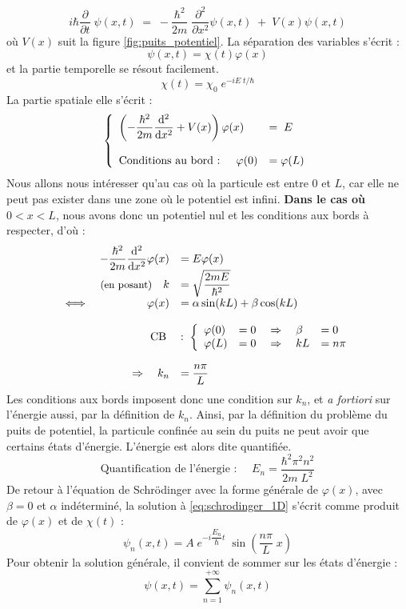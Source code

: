 \begin{equation}\label{eq:schrodinger_1D}
i \hbar \dfrac{\partial }{\partial t} \; \psi(x, t) \; = \; -\dfrac{\hbar ^2}{2m} \; \dfrac{ \partial ^2}{\partial x^2} \psi(x, t) \; + \; V(x) \psi(x,t)
\end{equation}
où $V(x)$ suit la figure \ref{fig:puits_potentiel}.
La séparation des variables s'écrit :
$$\psi(x,t) = \chi(t) \varphi(x)$$ et la partie temporelle se résout facilement.
$$\chi(t) = \chi_0 \; e^{-iE\; t/\hbar}$$
La partie spatiale elle s'écrit :
$$\left \{ \begin{array}{ll}
\left(-\dfrac{\hbar ^2}{2m} \dfrac{ \mathrm{d} ^2}{\mathrm{d} x^2 }  + V(x)\right) \varphi(x) \; &= \; E \\ \strut \\
\text{Conditions au bord : } \quad \varphi(0) &= \varphi(L)
\end{array} \right. $$
Nous allons nous intéresser qu'au cas où la particule est entre $0$ et $L$, car elle ne peut pas exister dans une zone où le potentiel est infini. \textbf{Dans le cas où} $0<x<L$, nous avons donc un potentiel nul et les conditions aux bords à respecter, d'où :
\begin{equation}
\begin{array}{lrl}
& -\dfrac{\hbar ^2}{2m} \dfrac{ \mathrm{d} ^2}{\mathrm{d} x^2 } \varphi(x) &= E \varphi (x) \\
&\text{\small (en posant)} \quad k &= \sqrt{\dfrac{2mE}{\hbar ^2}} \\
\iff & \varphi(x) &= \alpha \sin(kL) + \beta\cos(kL) \\ \strut \\
&\text{CB} \;  &:  \; \left\{ \begin{array}{lll}
\varphi(0) &= 0 \quad \Rightarrow \quad \beta &= 0 \\
\varphi(L) &= 0 \quad \Rightarrow \quad kL &= n\pi \\
\end{array}\right. \\ \strut \\
&\Rightarrow \quad k_n &= \dfrac{n\pi}{L}
\end{array}
\end{equation}
Les conditions aux bords imposent donc une condition sur $k_n$, et \textit{a fortiori} sur l'énergie aussi, par la définition de $k_n$. Ainsi, par la définition du problème du puits de potentiel, la particule confinée au sein du puits ne peut avoir que certains états d'énergie. L'énergie est alors dite quantifiée.
\begin{equation}\label{eq:quantification_energie}
\boxed{\text{Quantification de l'énergie : } \quad E_n = \dfrac{\hbar ^2 \pi ^2 n ^2}{2m \; L^2}}
\end{equation}
De retour à l'équation de Schrödinger avec la forme générale de $\varphi(x)$, avec $\beta = 0$ et $\alpha$ indéterminé, la solution à \eqref{eq:schrodinger_1D} s'écrit comme produit de $\varphi(x)$ et de $\chi(t)$ :
$$\psi_n(x,t) = A \; e^{-i \dfrac{E_n}{\hbar}t} \; \sin(\dfrac{n\pi}{L} \; x) $$
Pour obtenir la solution générale, il convient de sommer sur les états d'énergie :
$$\psi(x,t) = \sum_{n=1} ^{+\infty} \psi_n(x,t) $$
